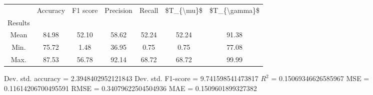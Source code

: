 \begin{tabular}{|c|c|c|c|c|c|c|}
\toprule
{} &  Accuracy &  F1 score &  Precision &  Recall &  \$T\_\{\textbackslash mu\}\$ &  \$T\_\{\textbackslash gamma\}\$ \\
Results &           &           &            &         &            &               \\
\hline
Mean    &     84.98 &     52.10 &      58.62 &   52.24 &      52.24 &         91.38 \\
Min.    &     75.72 &      1.48 &      36.95 &    0.75 &       0.75 &         77.08 \\
Max.    &     87.53 &     56.78 &      92.14 &   68.72 &      68.72 &         99.99 \\
\bottomrule
\end{tabular}

 Dev. std. accuracy = 2.3948402952121843
 Dev. std. F1-score = 9.741598541473817
 $R^2$ = 0.15069346626585967
 MSE = 0.11614206700495591
 RMSE = 0.34079622504504936
 MAE = 0.1509601899327382
